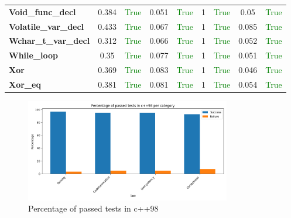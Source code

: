 \documentclass{article}
\begin{document}
\begin{xltabular}{\textwidth}{lcccccccc}
\textbf{{\fontsize{10}{12}\selectfont Void\_func\_decl}}& 0.384&\textcolor{green}{True}& 0.051&\textcolor{green}{True}& 1&\textcolor{green}{True}& 0.05&\textcolor{green}{True} \\[0.5ex]
\textbf{{\fontsize{10}{12}\selectfont Volatile\_var\_decl}}& 0.433&\textcolor{green}{True}& 0.067&\textcolor{green}{True}& 1&\textcolor{green}{True}& 0.085&\textcolor{green}{True} \\[0.5ex]
\textbf{{\fontsize{10}{12}\selectfont Wchar\_t\_var\_decl}}& 0.312&\textcolor{green}{True}& 0.066&\textcolor{green}{True}& 1&\textcolor{green}{True}& 0.052&\textcolor{green}{True} \\[0.5ex]
\textbf{{\fontsize{10}{12}\selectfont While\_loop}}& 0.35&\textcolor{green}{True}& 0.077&\textcolor{green}{True}& 1&\textcolor{green}{True}& 0.051&\textcolor{green}{True} \\[0.5ex]
\textbf{{\fontsize{10}{12}\selectfont Xor}}& 0.369&\textcolor{green}{True}& 0.083&\textcolor{green}{True}& 1&\textcolor{green}{True}& 0.046&\textcolor{green}{True} \\[0.5ex]
\textbf{{\fontsize{10}{12}\selectfont Xor\_eq}}& 0.381&\textcolor{green}{True}& 0.081&\textcolor{green}{True}& 1&\textcolor{green}{True}& 0.054&\textcolor{green}{True} \\[0.5ex]
\bottomrule
\end{xltabular}
\newpage
\begin{figure}[h!]
\centering
\includegraphics[width=0.8\textwidth]{../reports/clava/images/c++98_percentage.png}
\caption{Percentage of passed tests in c++98}
\label{fig:c++98_percentage}
\end{figure}
\newpage
\end{document}
